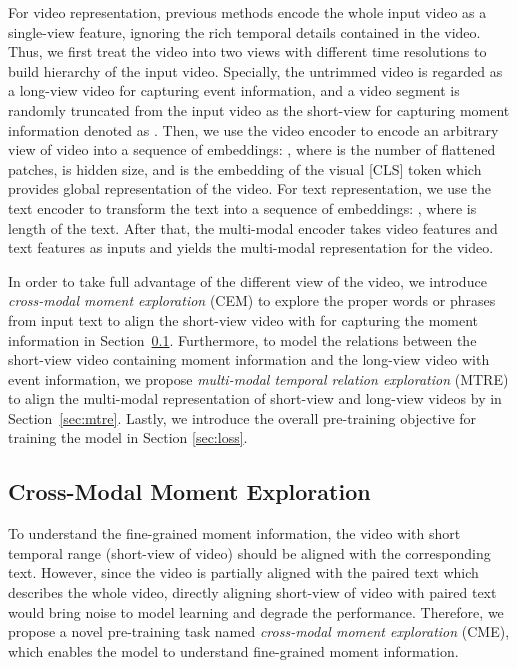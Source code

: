 \documentclass[10pt,twocolumn,letterpaper]{article}
\begin{document}
For video representation, previous methods \cite{lei2021clipbert,li2022alpro,li2022lavender} encode the whole input video as a single-view feature, ignoring the rich temporal details contained in the video. Thus, we first treat the video into two views with different time resolutions to build hierarchy of the input video. Specially, the untrimmed video is regarded as a long-view video  for capturing event information, and a video segment is randomly truncated from the input video as the short-view for capturing moment information denoted as . Then, we use the video encoder to encode an arbitrary view of video  into a sequence of embeddings: , where  is the number of flattened patches,  is hidden size, and  is the embedding of the visual [CLS] token which provides global representation of the video. For text representation, we use the text encoder to transform the text  into a sequence of embeddings: , where  is length of the text. After that, the multi-modal encoder takes video features  and text features  as inputs and yields the multi-modal representation  for the video.

In order to take full advantage of the different view of the video, we introduce \textit{cross-modal moment exploration} (CEM) to explore the proper words or phrases from input text to align the short-view video with  for capturing the moment information in Section~\ref{sec:cme}. Furthermore, to model the relations between the short-view video containing moment information and the long-view video with event information, we propose \textit{multi-modal temporal relation exploration} (MTRE) 
to align the multi-modal representation of short-view and long-view videos by  in Section~\ref{sec:mtre}. Lastly, we introduce the overall pre-training objective for training the model in Section \ref{sec:loss}.





\subsection{Cross-Modal Moment Exploration}
\label{sec:cme}


To understand the fine-grained moment information, the video with short temporal range (\ie short-view of video) should be aligned with the corresponding text. However, since the video is partially aligned with the paired text which describes the whole video, directly aligning short-view of video with paired text would bring noise to model learning and degrade the performance. Therefore, we propose a novel pre-training task named \textit{cross-modal moment exploration} (CME), which enables the model to understand fine-grained moment information.
\end{document}
